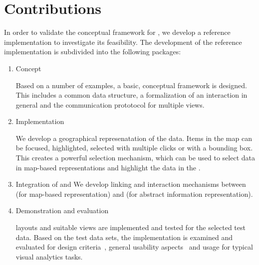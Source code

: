 \section{Contributions}

In order to validate the conceptual framework for \cmvs{}, we develop a reference implementation to investigate its feasibility.
The development of the reference implementation is subdivided into the following packages:

\begin{enumerate}
  \item
    Concept

    Based on a number of examples, a basic, conceptual framework is designed.
    This includes a common data structure, a formalization of an interaction in general and the communication prototocol for multiple views.

  \item
    Implementation

    We develop a geographical represenatation of the data.
    Items in the map can be focused, highlighted, selected with multiple clicks or with a bounding box.
    This creates a powerful selection mechanism, which can be used to select data in map-based representations and highlight the data in the \tmap{}.

  \item
    Integration of \tmap{} and \map{}
    We develop linking and interaction mechanisms between \maps{} (for map-based representation) and \tmaps{} (for abstract information representation).

  \item
    Demonstration and evaluation

    \cmv{} layouts and suitable views are implemented and tested for the selected test data.
    Based on the test data sets, the \cmv{} implementation is examined and evaluated for design criteria~\cite{Baldonado2000}, general usability aspects~\cite{Roberts2007} and usage for typical visual analytics tasks.
\end{enumerate}

